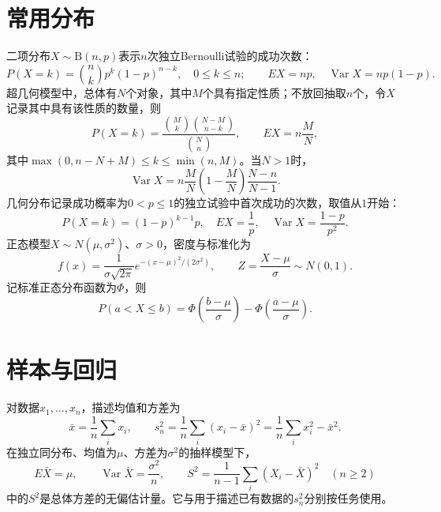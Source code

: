 \section{常用分布}

二项分布\(X\sim\mathrm B(n,p)\)表示\(n\)次独立Bernoulli试验的成功次数：
\begin{equation*}
 P(X=k)=\binom nk p^k(1-p)^{n-k},\quad 0\le k\le n;
 \qquad EX=np,\quad\operatorname{Var}X=np(1-p).
\end{equation*}
超几何模型中，总体有\(N\)个对象，其中\(M\)个具有指定性质；不放回抽取\(n\)个，令\(X\)记录其中具有该性质的数量，则
\begin{equation*}
 P(X=k)=\frac{\binom Mk\binom{N-M}{n-k}}{\binom Nn},\qquad EX=n\frac MN,
\end{equation*}
其中\(\max(0,n-N+M)\le k\le\min(n,M)\)。当\(N>1\)时，
\begin{equation*}
 \operatorname{Var}X=n\frac MN\left(1-\frac MN\right)\frac{N-n}{N-1}.
\end{equation*}
几何分布记录成功概率为\(0<p\le1\)的独立试验中首次成功的次数，取值从\(1\)开始：
\begin{equation*}
 P(X=k)=(1-p)^{k-1}p,\quad EX=\frac1p,\quad
 \operatorname{Var}X=\frac{1-p}{p^2}.
\end{equation*}
正态模型\(X\sim N(\mu,\sigma^2)\)、\(\sigma>0\)，密度与标准化为
\begin{equation*}
 f(x)=\frac1{\sigma\sqrt{2\pi}}e^{-(x-\mu)^2/(2\sigma^2)},\qquad
 Z=\frac{X-\mu}{\sigma}\sim N(0,1).
\end{equation*}
记标准正态分布函数为\(\Phi\)，则
\begin{equation*}
 P(a<X\le b)=\Phi\left(\frac{b-\mu}\sigma\right)-\Phi\left(\frac{a-\mu}\sigma\right).
\end{equation*}

\section{样本与回归}

对数据\(x_1,\ldots,x_n\)，描述均值和方差为
\begin{equation*}
 \bar x=\frac1n\sum_i x_i,\qquad
 s_n^2=\frac1n\sum_i(x_i-\bar x)^2=\frac1n\sum_i x_i^2-\bar x^2.
\end{equation*}
在独立同分布、均值为\(\mu\)、方差为\(\sigma^2\)的抽样模型下，
\begin{equation*}
 E\bar X=\mu,\qquad\operatorname{Var}\bar X=\frac{\sigma^2}{n},\qquad
 S^2=\frac1{n-1}\sum_i(X_i-\bar X)^2\quad(n\ge2)
\end{equation*}
中的\(S^2\)是总体方差的无偏估计量。它与用于描述已有数据的\(s_n^2\)分别按任务使用。

